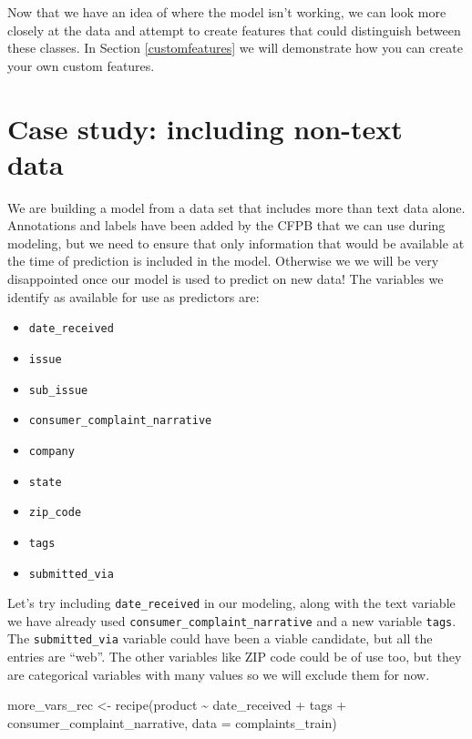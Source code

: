 \documentclass[
]{krantz}
\makeatletter
\newenvironment{Shaded}{\begin{snugshade}}{\end{snugshade}}
\newcommand{\AttributeTok}[1]{\textcolor[rgb]{0.77,0.63,0.00}{#1}}
\newcommand{\FunctionTok}[1]{\textcolor[rgb]{0.00,0.00,0.00}{#1}}
\newcommand{\NormalTok}[1]{#1}
\newcommand{\OtherTok}[1]{\textcolor[rgb]{0.56,0.35,0.01}{#1}}
\newcommand{\SpecialCharTok}[1]{\textcolor[rgb]{0.00,0.00,0.00}{#1}}
\newenvironment{kframe}{%
\medskip{}
\setlength{\fboxsep}{.8em}
 \def\at@end@of@kframe{}%
 \ifinner\ifhmode%
  \def\at@end@of@kframe{\end{minipage}}%
  \begin{minipage}{\columnwidth}%
 \fi\fi%
 \def\FrameCommand##1{\hskip\@totalleftmargin \hskip-\fboxsep
 \colorbox{shadecolor}{##1}\hskip-\fboxsep
     \hskip-\linewidth \hskip-\@totalleftmargin \hskip\columnwidth}%
 \MakeFramed {\advance\hsize-\width
   \@totalleftmargin\z@ \linewidth\hsize
   \@setminipage}}%
 {\par\unskip\endMakeFramed%
 \at@end@of@kframe}
\renewenvironment{Shaded}{\begin{kframe}}{\end{kframe}}
\makeatother
\begin{document}
Now that we have an idea of where the model isn't working, we can look more closely at the data and attempt to create features that could distinguish between these classes. In Section \ref{customfeatures} we will demonstrate how you can create your own custom features.

\hypertarget{case-study-including-non-text-data}{%
\section{Case study: including non-text data}\label{case-study-including-non-text-data}}

We are building a model from a data set that includes more than text data alone. Annotations and labels have been added by the CFPB that we can use during modeling, but we need to ensure that only information that would be available at the time of prediction is included in the model.
Otherwise we we will be very disappointed once our model is used to predict on new data!
The variables we identify as available for use as predictors are:

\begin{itemize}
\item
  \texttt{date\_received}
\item
  \texttt{issue}
\item
  \texttt{sub\_issue}
\item
  \texttt{consumer\_complaint\_narrative}
\item
  \texttt{company}
\item
  \texttt{state}
\item
  \texttt{zip\_code}
\item
  \texttt{tags}
\item
  \texttt{submitted\_via}
\end{itemize}

Let's try including \texttt{date\_received} in our modeling, along with the text variable we have already used \texttt{consumer\_complaint\_narrative} and a new variable \texttt{tags}.
The \texttt{submitted\_via} variable could have been a viable candidate, but all the entries are ``web''.
The other variables like ZIP code could be of use too, but they are categorical variables with many values so we will exclude them for now.

\begin{Shaded}
\begin{Highlighting}[]
\NormalTok{more\_vars\_rec }\OtherTok{\textless{}{-}}
  \FunctionTok{recipe}\NormalTok{(product }\SpecialCharTok{\textasciitilde{}}\NormalTok{ date\_received }\SpecialCharTok{+}\NormalTok{ tags }\SpecialCharTok{+}\NormalTok{ consumer\_complaint\_narrative,}
         \AttributeTok{data =}\NormalTok{ complaints\_train)}
\end{Highlighting}
\end{Shaded}
\end{document}
